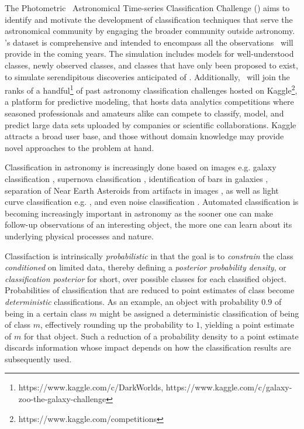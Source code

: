 The Photometric \lsst\ Astronomical Time-series Classification Challenge (\plasticc) aims to identify and motivate the development of classification techniques that serve the astronomical community by engaging the broader community outside astronomy.
\plasticc's dataset is comprehensive and intended to encompass all the observations \lsst\ will provide in the coming years.
The simulation includes models for well-understood classes, newly observed classes, and classes that have only been proposed to exist, to simulate serendipitous discoveries anticipated of \lsst.
Additionally, \plasticc\ will join the ranks of a handful\footnote{https://www.kaggle.com/c/DarkWorlds, https://www.kaggle.com/c/galaxy-zoo-the-galaxy-challenge} of past astronomy classification challenges hosted on Kaggle\footnote{https://www.kaggle.com/competitions}, a platform for predictive modeling, that hosts data analytics competitions where seasoned professionals and amateurs alike can compete to classify, model, and predict large data sets uploaded by companies or scientific collaborations.
Kaggle attracts a broad user base, and those without domain knowledge may provide novel approaches to the problem at hand.

Classification in astronomy is increasingly done based on images e.g. galaxy classification \citep{2016A&C....16...34H}, supernova classification \citep{2017ApJ...836...97C}, identification of bars in galaxies \citep{2018MNRAS.477..894A}, separation of Near Earth Asteroids from artifacts in images \citep{2016PASJ...68..104M}, as well as light curve classification e.g. \citet{2016PASJ...68..104M, 2017arXiv170906257M, 2017CQGra..34f4003Z}, and even noise classification \citet{2017CQGra..34f4003Z, 2018PhRvD..97j1501G}.
Automated classification \cite{2011arXiv1110.4655D, 2012arXiv1209.1681D, 2018ApJS..236....9N,2012PASP..124.1175B} is becoming increasingly important in astronomy as the sooner one can make follow-up observations of an interesting object, the more one can learn about its underlying physical processes and nature.

Classifaction is intrinsically \textit{probabilistic} in that the goal is to \textit{constrain} the class \textit{conditioned} on limited data, thereby defining a \textit{posterior probability density}, or \textit{classification posterior} for short, over possible classes for each classified object.
Probabilities of classification that are reduced to point estimates of class become \textit{deterministic} classifications.
As an example, an object with probability $0.9$ of being in a certain class $m$ might be assigned a deterministic classification of being of class $m$, effectively rounding up the probability to $1$, yielding a point estimate of $m$ for that object.
Such a reduction of a probability density to a point estimate discards information whose impact depends on how the classification results are subsequently used.


